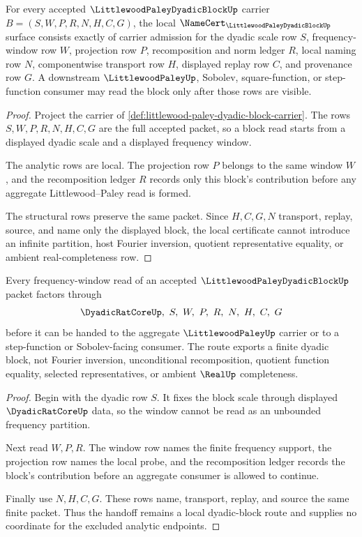 \begin{theorem}
\label{thm:littlewood-paley-dyadic-block-namecert-obligations}
For every accepted $\LittlewoodPaleyDyadicBlockUp$ carrier $B=(S,W,P,R,N,H,C,G)$, the local $\NameCert_{\LittlewoodPaleyDyadicBlockUp}$ surface consists exactly of carrier admission for the dyadic scale row $S$, frequency-window row $W$, projection row $P$, recomposition and norm ledger $R$, local naming row $N$, componentwise transport row $H$, displayed replay row $C$, and provenance row $G$. A downstream $\LittlewoodPaleyUp$, Sobolev, square-function, or step-function consumer may read the block only after those rows are visible.
\end{theorem}
\begin{proof}
Project the carrier of \autoref{def:littlewood-paley-dyadic-block-carrier}. The rows $S,W,P,R,N,H,C,G$ are the full accepted packet, so a block read starts from a displayed dyadic scale and a displayed frequency window.

The analytic rows are local. The projection row $P$ belongs to the same window $W$, and the recomposition ledger $R$ records only this block's contribution before any aggregate Littlewood--Paley read is formed.

The structural rows preserve the same packet. Since $H,C,G,N$ transport, replay, source, and name only the displayed block, the local certificate cannot introduce an infinite partition, host Fourier inversion, quotient representative equality, or ambient real-completeness row.
\end{proof}

\begin{theorem}
\label{thm:littlewood-paley-dyadic-block-frequency-window-route}
Every frequency-window read of an accepted $\LittlewoodPaleyDyadicBlockUp$ packet factors through
$$
\DyadicRatCoreUp,\ S,\ W,\ P,\ R,\ N,\ H,\ C,\ G
$$
before it can be handed to the aggregate $\LittlewoodPaleyUp$ carrier or to a step-function or Sobolev-facing consumer. The route exports a finite dyadic block, not Fourier inversion, unconditional recomposition, quotient function equality, selected representatives, or ambient $\RealUp$ completeness.
\end{theorem}
\begin{proof}
Begin with the dyadic row $S$. It fixes the block scale through displayed $\DyadicRatCoreUp$ data, so the window cannot be read as an unbounded frequency partition.

Next read $W,P,R$. The window row names the finite frequency support, the projection row names the local probe, and the recomposition ledger records the block's contribution before an aggregate consumer is allowed to continue.

Finally use $N,H,C,G$. These rows name, transport, replay, and source the same finite packet. Thus the handoff remains a local dyadic-block route and supplies no coordinate for the excluded analytic endpoints.
\end{proof}

